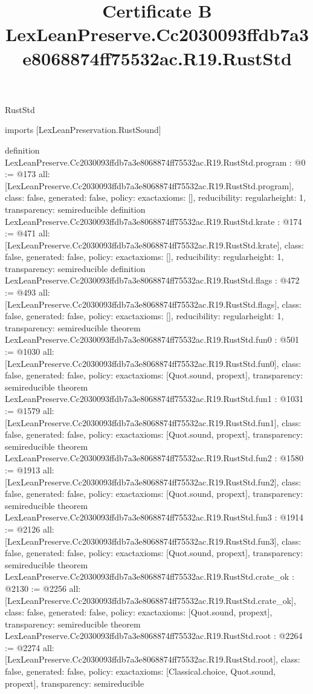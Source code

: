 \begin{lexlean}{RustStd}
\title{Certificate B LexLeanPreserve.Cc2030093ffdb7a3e8068874ff75532ac.R19.RustStd}
\begin{coremodule}
imports [LexLeanPreservation.RustSound]

definition LexLeanPreserve.Cc2030093ffdb7a3e8068874ff75532ac.R19.RustStd.program : @0 := @173 {
  all: [LexLeanPreserve.Cc2030093ffdb7a3e8068874ff75532ac.R19.RustStd.program],
  class: false,
  generated: false,
  policy: exact{axioms: []},
  reducibility: regular{height: 1},
  transparency: semireducible
}
definition LexLeanPreserve.Cc2030093ffdb7a3e8068874ff75532ac.R19.RustStd.krate : @174 := @471 {
  all: [LexLeanPreserve.Cc2030093ffdb7a3e8068874ff75532ac.R19.RustStd.krate],
  class: false,
  generated: false,
  policy: exact{axioms: []},
  reducibility: regular{height: 1},
  transparency: semireducible
}
definition LexLeanPreserve.Cc2030093ffdb7a3e8068874ff75532ac.R19.RustStd.flags : @472 := @493 {
  all: [LexLeanPreserve.Cc2030093ffdb7a3e8068874ff75532ac.R19.RustStd.flags],
  class: false,
  generated: false,
  policy: exact{axioms: []},
  reducibility: regular{height: 1},
  transparency: semireducible
}
theorem LexLeanPreserve.Cc2030093ffdb7a3e8068874ff75532ac.R19.RustStd.fun0 : @501 := @1030 {
  all: [LexLeanPreserve.Cc2030093ffdb7a3e8068874ff75532ac.R19.RustStd.fun0],
  class: false,
  generated: false,
  policy: exact{axioms: [Quot.sound, propext]},
  transparency: semireducible
}
theorem LexLeanPreserve.Cc2030093ffdb7a3e8068874ff75532ac.R19.RustStd.fun1 : @1031 := @1579 {
  all: [LexLeanPreserve.Cc2030093ffdb7a3e8068874ff75532ac.R19.RustStd.fun1],
  class: false,
  generated: false,
  policy: exact{axioms: [Quot.sound, propext]},
  transparency: semireducible
}
theorem LexLeanPreserve.Cc2030093ffdb7a3e8068874ff75532ac.R19.RustStd.fun2 : @1580 := @1913 {
  all: [LexLeanPreserve.Cc2030093ffdb7a3e8068874ff75532ac.R19.RustStd.fun2],
  class: false,
  generated: false,
  policy: exact{axioms: [Quot.sound, propext]},
  transparency: semireducible
}
theorem LexLeanPreserve.Cc2030093ffdb7a3e8068874ff75532ac.R19.RustStd.fun3 : @1914 := @2126 {
  all: [LexLeanPreserve.Cc2030093ffdb7a3e8068874ff75532ac.R19.RustStd.fun3],
  class: false,
  generated: false,
  policy: exact{axioms: [Quot.sound, propext]},
  transparency: semireducible
}
theorem LexLeanPreserve.Cc2030093ffdb7a3e8068874ff75532ac.R19.RustStd.crate_ok : @2130 := @2256 {
  all: [LexLeanPreserve.Cc2030093ffdb7a3e8068874ff75532ac.R19.RustStd.crate_ok],
  class: false,
  generated: false,
  policy: exact{axioms: [Quot.sound, propext]},
  transparency: semireducible
}
theorem LexLeanPreserve.Cc2030093ffdb7a3e8068874ff75532ac.R19.RustStd.root : @2264 := @2274 {
  all: [LexLeanPreserve.Cc2030093ffdb7a3e8068874ff75532ac.R19.RustStd.root],
  class: false,
  generated: false,
  policy: exact{axioms: [Classical.choice, Quot.sound, propext]},
  transparency: semireducible
}


\end{coremodule}
\end{lexlean}
